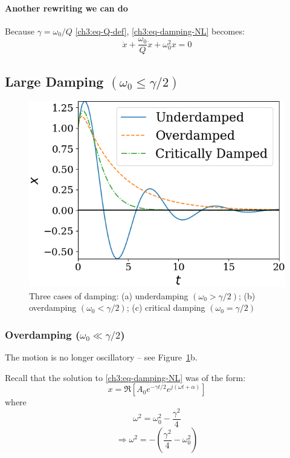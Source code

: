 \paragraph{Another rewriting we can do}
Because $\gamma=\omega_0/Q$ \eqref{ch3:eq-Q-def}, \eqref{ch3:eq-damping-NL} becomes:
\[ \boxed{ \ddot{x} + \frac{\omega_0}{Q}\dot{x} + \omega_0^2 x = 0 } \]


\subsection{Large Damping $(\omega_0 \leq \gamma/2)$}

\begin{figure}
	\centering
	\includegraphics[scale=0.7]{phys232/Ch3-damped-oscillators-graph.png} \caption{Three cases of damping: (a) underdamping $(\omega_0>\gamma/2)$; (b) overdamping $(\omega_0<\gamma/2)$; (c) critical damping $(\omega_0=\gamma/2)$} \label{ch3:fig-damping}
\end{figure}


\subsubsection{Overdamping ($ \omega_0 \ll \gamma/2 $)}
The motion is no longer oscillatory -- see Figure~\ref{ch3:fig-damping}b.

Recall that the solution to \eqref{ch3:eq-damping-NL} was of the form:
\[ 	x = \Re\left[ A_0 e^{-\gamma t/2} e^{j(\omega t+\alpha)} \right] \]
where
\[ \omega^2 = \omega_0^2 - \frac{\gamma^2}{4} \]
\[ \Longrightarrow \omega^2 =  -\left( \frac{\gamma^2}{4} - \omega_0^2 \right)  \]

